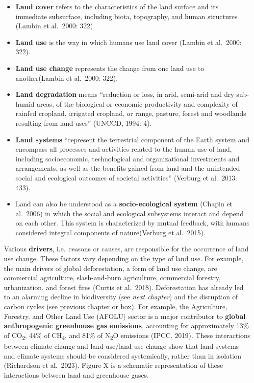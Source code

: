 \documentclass[
  a4paper,
  openany]{book}
\begin{document}
\begin{itemize}
\item
  \textbf{Land cover} refers to the characteristics of the land surface
  and its immediate subsurface, including biota, topography, and human
  structures (Lambin et al.~2000: 322).
\item
  \textbf{Land use} is the way in which humans use land cover (Lambin et
  al.~2000: 322).
\item
  \textbf{Land use change} represents the change from one land use to
  another(Lambin et al.~2000: 322).
\item
  \textbf{Land degradation} means ``reduction or loss, in arid,
  semi-arid and dry sub-humid areas, of the biological or economic
  productivity and complexity of rainfed cropland, irrigated cropland,
  or range, pasture, forest and woodlands resulting from land uses''
  (UNCCD, 1994: 4).
\item
  \textbf{Land systems} ``represent the terrestrial component of the
  Earth system and encompass all processes and activities related to the
  human use of land, including socioeconomic, technological and
  organizational investments and arrangements, as well as the benefits
  gained from land and the unintended social and ecological outcomes of
  societal activities'' (Verburg et al.~2013: 433).
\item
  Land can also be understood as a \textbf{socio-ecological system}
  (Chapin et al.~2006) in which the social and ecological subsystems
  interact and depend on each other. This system is characterized by
  mutual feedback, with humans considered integral components of
  nature(Verburg et al.~2015).
\end{itemize}

Various \textbf{drivers}, i.e.~reasons or causes, are responsible for
the occurrence of land use change. These factors vary depending on the
type of land use. For example, the main drivers of global deforestation,
a form of land use change, are commercial agriculture, slash-and-burn
agriculture, commercial forestry, urbanization, and forest fires (Curtis
et al.~2018). Deforestation has already led to an alarming decline in
biodiversity (see \emph{next chapter}) and the disruption of carbon
cycles (see previous chapter or box). For example, the Agriculture,
Forestry, and Other Land Use (AFOLU) sector is a major contributor to
\textbf{global anthropogenic greenhouse gas} \textbf{emissions},
accounting for approximately 13\% of CO\textsubscript{2}, 44\% of
CH\textsubscript{4}, and 81\% of N\textsubscript{2}O emissions (IPCC,
2019). These interactions between climate change and land use/land use
change show that land systems and climate systems should be considered
systemically, rather than in isolation (Richardson et al.~2023). Figure
X is a schematic representation of these interactions between land and
greenhouse gases.
\end{document}
